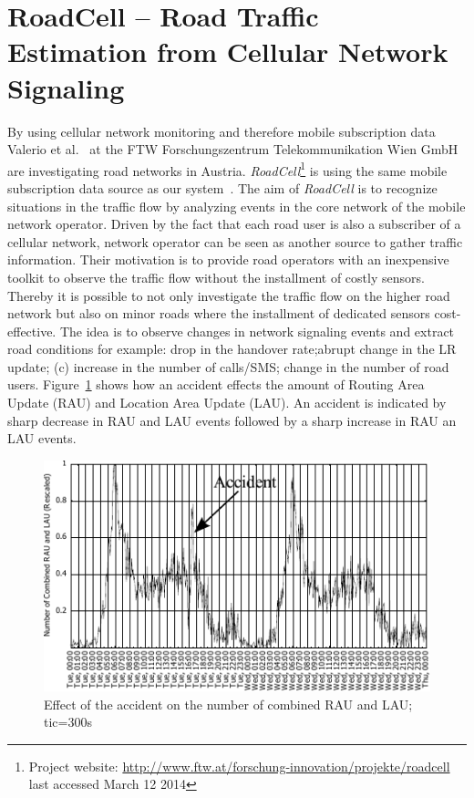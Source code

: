 \documentclass[master,english]{hgbthesis}
\begin{document}
\section{RoadCell -- Road Traffic Estimation from Cellular Network Signaling}
By using cellular network monitoring and therefore mobile subscription data Valerio et al.\ \cite{Valerio2009,Valerio20092} at the FTW Forschungszentrum Telekommunikation Wien GmbH are investigating road networks in Austria. \emph{RoadCell}\footnote{Project website: \url{http://www.ftw.at/forschung-innovation/projekte/roadcell} last accessed March 12 2014} is using the same mobile subscription data source as our system~\cite{RoadCell2009}. The aim of \emph{RoadCell} is to recognize situations in the traffic flow by analyzing events in the core network of the mobile network operator. Driven by the fact that each road user is also a subscriber of a cellular network, network operator can be seen as another source to gather traffic information. Their motivation is to provide road operators with an inexpensive toolkit to observe the traffic flow without the installment of costly sensors. Thereby it is possible to not only investigate the traffic flow on the higher road network but also on minor roads where the installment of dedicated sensors cost-effective.
The idea is to observe changes in network signaling events and extract road conditions for example: drop in the handover rate;abrupt change in the LR update; (c) increase in the number of calls/SMS; change in the number of road users. Figure~\ref{fig:raodcell_accident} shows how an accident effects the amount of Routing Area Update (RAU) and Location Area Update (LAU). An accident is indicated by sharp decrease in RAU and LAU events followed by a sharp increase in RAU an LAU events.
\begin{figure}
\centering
\includegraphics[width=0.7\linewidth]{./images/raodcell_accident}
\caption{Effect of the accident on the number of combined RAU and LAU; tic=300s \cite{Valerio20092}}
\label{fig:raodcell_accident}
\end{figure}
\end{document}

